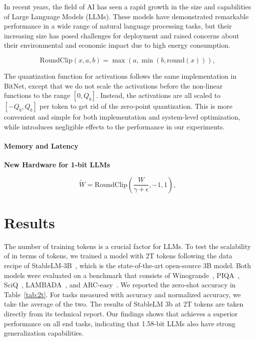 In recent years, the field of AI has seen a rapid growth in the size and capabilities of Large Language Models (LLMs). These models have demonstrated remarkable performance in a wide range of natural language processing tasks, but their increasing size has posed challenges for deployment and raised concerns about their environmental and economic impact due to high energy consumption. 

\begin{equation}
    \mathrm{RoundClip}(x, a, b) = \max(a, \min(b, \mathrm{round}(x))),
\end{equation}

The quantization function for activations follows the same implementation in BitNet, except that we do not scale the activations before the non-linear functions to the range $[0, Q_b]$. Instead, the activations are all scaled to $[-Q_b, Q_b]$ per token to get rid of the zero-point quantization. This is more convenient and simple for both implementation and system-level optimization, while introduces negligible effects to the performance in our experiments.

\paragraph{Memory and Latency}

\textbf{New Hardware for 1-bit LLMs}

\begin{equation}
    \widetilde{W} = \mathrm{RoundClip}(\frac{W}{\gamma + \epsilon}, -1, 1),
\end{equation}

\section{Results}

The number of training tokens is a crucial factor for LLMs. To test the scalability of  in terms of tokens, we trained a  model with 2T tokens following the data recipe of StableLM-3B~\cite{StableLM-3B-4E1T}, which is the state-of-the-art open-source 3B model. Both models were evaluated on a benchmark that consists of Winogrande~\cite{winoGrande}, PIQA~\cite{piqa}, SciQ~\cite{sciq}, LAMBADA~\cite{lambada}, and ARC-easy~\cite{arc}. We reported the zero-shot accuracy in Table~\ref{tab:2t}. For tasks measured with accuracy and normalized accuracy, we take the average of the two. The results of StableLM 3b at 2T tokens are taken directly from its technical report. Our findings shows that  achieves a superior performance on all end tasks, indicating that 1.58-bit LLMs also have strong generalization capabilities.

